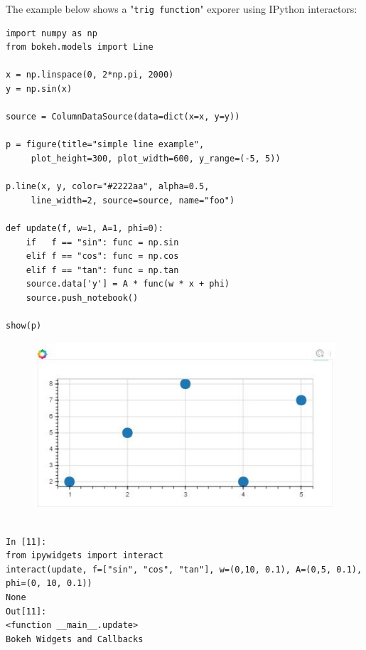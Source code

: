 \documentclass[a4paper,12pt]{article}
\begin{document}
The example below shows a "\texttt{trig function}" exporer using IPython interactors:

\begin{framed}
\begin{verbatim}
import numpy as np
from bokeh.models import Line

x = np.linspace(0, 2*np.pi, 2000)
y = np.sin(x)

source = ColumnDataSource(data=dict(x=x, y=y))

p = figure(title="simple line example", 
     plot_height=300, plot_width=600, y_range=(-5, 5))
     
p.line(x, y, color="#2222aa", alpha=0.5, 
     line_width=2, source=source, name="foo")

def update(f, w=1, A=1, phi=0):
    if   f == "sin": func = np.sin
    elif f == "cos": func = np.cos
    elif f == "tan": func = np.tan
    source.data['y'] = A * func(w * x + phi)
    source.push_notebook()

show(p)
\end{verbatim}
\end{framed}

\begin{figure}
\centering
\includegraphics[width=0.7\linewidth]{images/06-interactions-tut-06}
\end{figure}

\begin{framed}
	\begin{verbatim}
	
In [11]:
from ipywidgets import interact
interact(update, f=["sin", "cos", "tan"], w=(0,10, 0.1), A=(0,5, 0.1), phi=(0, 10, 0.1))
None
Out[11]:
<function __main__.update>
Bokeh Widgets and Callbacks
	
\end{verbatim}
\end{framed}

\newpage
\end{document}
